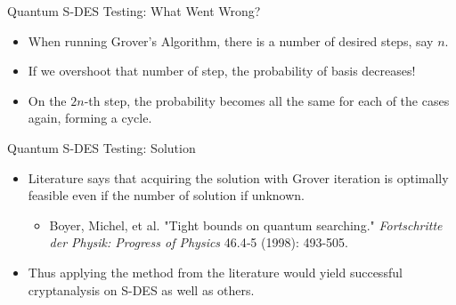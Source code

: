 \documentclass{beamer}
\begin{document}
    \begin{frame}{Quantum S-DES Testing: What Went Wrong?}
        \begin{itemize}
            \item When running Grover's Algorithm, there is a number of desired steps, say $n$.
            \item If we overshoot that number of step, the probability of basis decreases!
            \item On the $2n$-th step, the probability becomes all the same for each of the cases again, forming a cycle.
        \end{itemize}
    \end{frame}
    
    \begin{frame}{Quantum S-DES Testing: Solution}
        \begin{itemize}
            \item Literature says that acquiring the solution with Grover iteration is optimally feasible even if the number of solution if unknown.
            \begin{itemize}
                \item Boyer, Michel, et al. "Tight bounds on quantum searching." \textit{Fortschritte der Physik: Progress of Physics} 46.4‐5 (1998): 493-505.
            \end{itemize}
            \item Thus applying the method from the literature would yield successful cryptanalysis on S-DES as well as others.
        \end{itemize}
    \end{frame}
\end{document}
